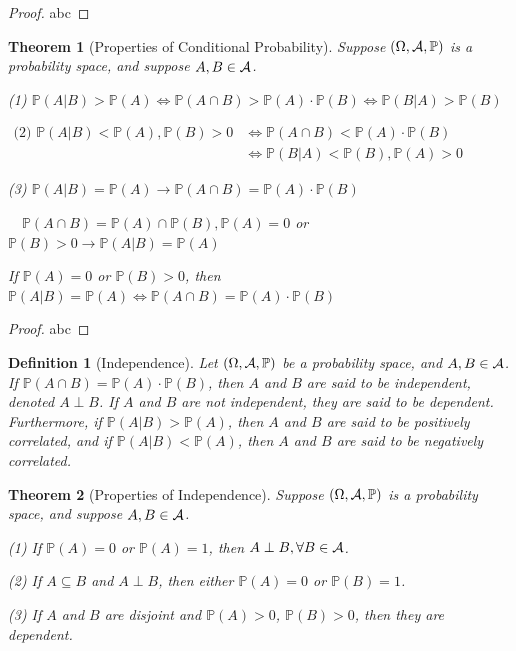 \documentclass[openany,12pt]{book}
\newtheorem{theorem}{Theorem}[chapter]
\newtheorem{definition}{Definition}[chapter]
\begin{document}
\begin{proof}
  abc
\end{proof}

\begin{theorem}[Properties of Conditional Probability]
  Suppose $(\Omega,\mathcal{A},\mathbb{P})$ is a probability space, and suppose $A,B\in\mathcal{A}$.

  (1) $\mathbb{P}(A|B)>\mathbb{P}(A)\Leftrightarrow \mathbb{P}(A\cap B)>\mathbb{P}(A)\cdot \mathbb{P}(B)\Leftrightarrow \mathbb{P}(B|A)>\mathbb{P}(B)$

  $\begin{aligned}
      \text{(2) }\mathbb{P}(A|B)<\mathbb{P}(A),\mathbb{P}(B)>0 & \Leftrightarrow \mathbb{P}\left(A\cap B\right)<\mathbb{P}(A)\cdot \mathbb{P}(B) \\
                                                               & \Leftrightarrow \mathbb{P}(B|A)<\mathbb{P}(B),\mathbb{P}(A)>0
    \end{aligned}$

  (3) $\mathbb{P}(A|B)=\mathbb{P}(A)\to \mathbb{P}(A\cap B)=\mathbb{P}(A)\cdot \mathbb{P}(B)$

  $\quad \mathbb{P}(A\cap B)=\mathbb{P}(A)\cap \mathbb{P}(B), \mathbb{P}(A)=0$ or $\mathbb{P}(B)>0\to \mathbb{P}(A|B)=\mathbb{P}(A)$

  If $\mathbb{P}(A)=0$ or $\mathbb{P}(B)>0$, then $\mathbb{P}(A|B)=\mathbb{P}(A)\Leftrightarrow \mathbb{P}(A\cap B)=\mathbb{P}(A)\cdot \mathbb{P}(B)  $

\end{theorem}

\begin{proof}
  abc
\end{proof}

\begin{definition}[Independence]
  Let $(\Omega,\mathcal{A},\mathbb{P})$ be a probability space, and $A,B\in\mathcal{A}$.
  If $\mathbb{P}(A\cap B)=\mathbb{P}(A)\cdot \mathbb{P}(B)$, then $A$ and $B$ are said to be independent, denoted $A\perp B$. If $A$ and $B$ are not independent, they are said to be dependent.
  Furthermore, if $\mathbb{P}(A|B)>\mathbb{P}(A)$, then $A$ and $B$ are said to be positively correlated, and if $\mathbb{P}(A|B)<\mathbb{P}(A)$, then $A$ and $B$ are said to be negatively correlated.
\end{definition}

\begin{theorem}[Properties of Independence]
  Suppose $(\Omega,\mathcal{A},\mathbb{P})$ is a probability space, and suppose  $A,B\in\mathcal{A}$.

  (1) If $\mathbb{P}(A)=0$ or $\mathbb{P}(A)=1$, then $A\perp B, \forall B\in\mathcal{A}$.

  (2) If $A\subseteq B$ and $A\perp B$, then either $\mathbb{P}(A)=0$ or $\mathbb{P}(B)=1$.

  (3) If $A$ and $B$ are disjoint and $\mathbb{P}(A)>0$, $\mathbb{P}(B)>0$, then they are dependent.

\end{theorem}
\end{document}
